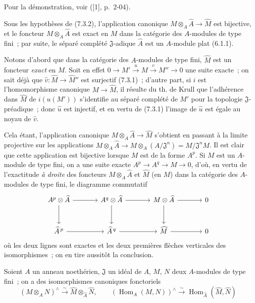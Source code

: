 Pour la démonstration, voir ([1], p.~2-04).


\begin{corollary}[7.3.3]
\label{0.7.3.3-fr}
Sous les hypothèses de \textup{(7.3.2)}, l'application canonique
$M\otimes_A\widehat A\to\widehat M$ est bijective, et le foncteur
$M\otimes_A\widehat A$ est exact en $M$ dans la catégorie des $A$-modules de
type fini~; par suite, le séparé complété $\mathfrak J$-adique $\widehat A$
est un $A$-module plat \textup{(6.1.1)}.
\end{corollary}

Notons d'abord que dans la catégorie des $A$-modules de type fini,
$\widehat M$ est un foncteur \emph{exact} en $M$. Soit en effet
$0\to M'\xrightarrow{u}M\xrightarrow{v}M''\to0$
une suite exacte~; on sait déjà que
$\widehat v:\widehat M\to\widehat{M}''$ est surjectif (7.3.1)~; d'autre part,
si $i$ est l'homomorphisme canonique $M\to\widehat M$, il résulte du th. de
Krull que l'adhérence dans $\widehat M$ de $i(u(M'))$ s'identifie au séparé
complété de $M'$ pour la topologie $\mathfrak J$-préadique~; donc
$\widehat u$ est injectif, et en vertu de (7.3.1) l'image de $\widehat u$ est
égale au noyau de $\widehat v$.

Cela étant, l'application canonique $M\otimes_A\widehat A\to\widehat M$
s'obtient en passant à la limite projective sur les applications
$M\otimes_A\widehat A\to M\otimes_A(A/\mathfrak J^n)=M/\mathfrak J^nM$.
Il est clair que cette application est bijective lorsque $M$ est de la forme
$A^p$. Si $M$ est un $A$-module de type fini, on a une suite exacte
$A^p\to A^q\to M\to0$, d'où, en vertu de l'exactitude \emph{à droite} des
foncteurs $M\otimes_A\widehat A$ et $\widehat M$ (en $M$) dans la catégorie
des $A$-modules de type fini, le diagramme commutatif
\[
\begin{tikzcd}[column sep=large,row sep=large]
  A^p\otimes\widehat A \arrow[r] \arrow[d] &
  A^q\otimes\widehat A \arrow[r] \arrow[d] &
  M\otimes\widehat A \arrow[r] \arrow[d] &
  0 \\
  \widehat A^{\,p} \arrow[r] &
  \widehat A^{\,q} \arrow[r] &
  \widehat M \arrow[r] &
  0
\end{tikzcd}
\]
où les deux lignes sont exactes et les deux premières flèches verticales des
isomorphismes~; on en tire aussitôt la conclusion.

\begin{corollary}[7.3.4]
\label{0.7.3.4-fr}
Soient $A$ un anneau noethérien, $\mathfrak J$ un idéal de $A$, $M$, $N$ deux
$A$-modules de type fini~; on a des isomorphismes canoniques fonctoriels
\[
  (M\otimes_A N)^\wedge
  \xrightarrow{\sim}
  \widehat M\otimes_{\widehat A}\widehat N,
  \qquad
  (\operatorname{Hom}_A(M,N))^\wedge
  \xrightarrow{\sim}
  \operatorname{Hom}_{\widehat A}(\widehat M,\widehat N)
\]
\end{corollary}


